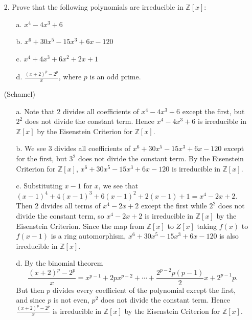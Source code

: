 \documentclass[10pt]{article}
\newcommand{\Z}{\mathbb{Z}}
\begin{document}
\begin{itemize}
\item[2.]  Prove that the following polynomials are irreducible in $\Z[x]$:
\begin{itemize}
\item[a.] $x^4 - 4x^3 + 6$
\item[b.] $x^6 + 30x^5 -15x^3 + 6x -120$
\item[c.] $x^4+4x^3+6x^2+2x+1$
\item[d.] $\frac{(x+2)^p-2^p}{x}$, where $p$ is an odd prime.
\end{itemize}
(Schamel)
\begin{itemize}
\item[a.]  Note that $2$ divides all coefficients of $x^4 - 4x^3 + 6$ except the first, but $2^2$ does not divide the constant term.  Hence $x^4 - 4x^3 + 6$ is irreducible in $\Z[x]$ by the Eisenstein Criterion for $\Z[x]$.
\item[b.]  We see $3$ divides all coefficients of $x^6 + 30x^5 -15x^3 + 6x -120$ except for the first, but $3^2$ does not divide the constant term.  By the Eisenstein Criterion for $\Z[x]$, $x^6 + 30x^5 -15x^3 + 6x -120$ is irreducible in $\Z[x]$.
\item[c.] Substituting $x-1$ for $x$, we see that $(x-1)^4+4(x-1)^3+6(x-1)^2+2(x-1)+1 = x^4-2x+2$.  Then $2$ divides all terms of $x^4-2x+2$ except the first while $2^2$ does not divide the constant term, so $x^4-2x+2$ is irreducible in $\Z[x]$ by the Eisenstein Criterion.  Since the map from $\Z[x]$ to $Z[x]$ taking $f(x)$ to $f(x-1)$ is a ring automorphism, $x^6 + 30x^5 -15x^3 + 6x -120$ is also irreducible in $\Z[x]$.
\item[d.] By the binomial theorem 
\[\frac{(x+2)^p-2^p}{x} = x^{p-1} + 2px^{p-2}+ \cdots + \frac{2^{p-2}p(p-1)}{2}x + 2^{p-1}p. \]
But then $p$ divides every coefficient of the polynomial except the first, and since $p$ is not even, $p^2$ does not divide the constant term.  Hence $\frac{(x+2)^p-2^p}{x}$ is irreducible in $\Z[x]$ by the Eisenstein Criterion for $\Z[x]$.
\end{itemize}



\end{itemize}
\end{document}
